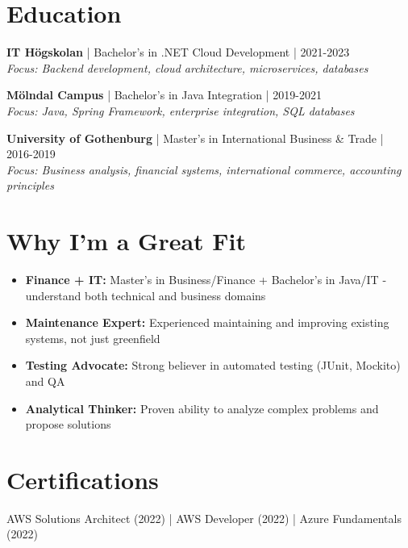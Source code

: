 \documentclass[10pt,a4paper]{article}
\begin{document}
\section*{Education}

\textbf{IT Högskolan} | Bachelor's in .NET Cloud Development | 2021-2023\\
\textit{Focus: Backend development, cloud architecture, microservices, databases}

\textbf{Mölndal Campus} | Bachelor's in Java Integration | 2019-2021\\
\textit{Focus: Java, Spring Framework, enterprise integration, SQL databases}

\textbf{University of Gothenburg} | Master's in International Business \& Trade | 2016-2019\\
\textit{Focus: Business analysis, financial systems, international commerce, accounting principles}

\section*{Why I'm a Great Fit}
\begin{itemize}[noitemsep]
\item \textbf{Finance + IT:} Master's in Business/Finance + Bachelor's in Java/IT - understand both technical and business domains
\item \textbf{Maintenance Expert:} Experienced maintaining and improving existing systems, not just greenfield
\item \textbf{Testing Advocate:} Strong believer in automated testing (JUnit, Mockito) and QA
\item \textbf{Analytical Thinker:} Proven ability to analyze complex problems and propose solutions
\end{itemize}

\section*{Certifications}
AWS Solutions Architect (2022) | AWS Developer (2022) | Azure Fundamentals (2022)
\end{document}
